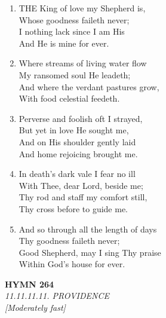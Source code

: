 \begin{enumerate}
    \item THE King of love my Shepherd is, \\
            Whose goodness faileth never; \\
        I nothing lack since I am His \\
            And He is mine for ever.

    \item Where streams of living water flow \\
            My ransomed soul He leadeth; \\
        And where the verdant pastures grow, \\
            With food celestial feedeth.

    \item Perverse and foolish oft I strayed, \\
            But yet in love He sought me, \\
        And on His shoulder gently laid \\
            And home rejoicing brought me.

    \item In death's dark vale I fear no ill \\
            With Thee, dear Lord, beside me; \\
        Thy rod and staff my comfort still, \\
            Thy cross before to guide me.

    \item And so through all the length of days \\
            Thy goodness faileth never; \\
        Good Shepherd, may I sing Thy praise \\
            Within God's house for ever.

\end{enumerate}

\newpage
\begin{center}
    {\Large \textbf{HYMN 264}}
    \\
    \textit{11.11.11.11. PROVIDENCE}
    \\
    \textit{\small [Moderately fast]}
\end{center}
\vspace{1em}

